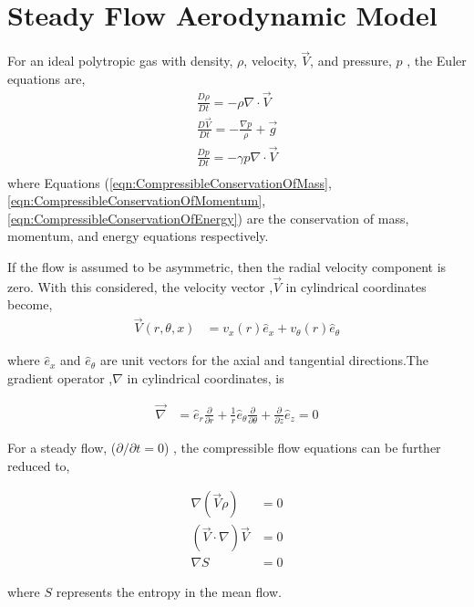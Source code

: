 \section{Steady Flow Aerodynamic Model}
\frame{\sectionpage}
\begin{frame} 
For an ideal polytropic gas with density, $\rho$, velocity, $\vec{V}$, and 
pressure, $p$ , the Euler equations are,
\begin{align}
    \frac{D\rho}{Dt} = - \rho \nabla \cdot \vec{V} 
    \label{eqn:CompressibleConservationOfMass} \\
    \frac{D\vec{V}}{Dt} = - \frac{\nabla p}{\rho} + \vec{g} 
    \label{eqn:CompressibleConservationOfMomentum} \\
    \frac{Dp}{Dt} = - \gamma p \nabla \cdot \vec{V} 
    \label{eqn:CompressibleConservationOfEnergy} \\
\end{align}
where Equations (\ref{eqn:CompressibleConservationOfMass},
\ref{eqn:CompressibleConservationOfMomentum},
\ref{eqn:CompressibleConservationOfEnergy}) are the conservation of mass, 
momentum, and energy equations respectively. 
\end{frame}
\begin{frame}
If the flow is assumed to be asymmetric, then the radial velocity component is 
zero. With this considered, the velocity vector ,$\vec{V}$ in cylindrical coordinates 
become,
\begin{align}
    \vec{V}(r,\theta,x) &= v_x(r) \hat{e}_x + v_{\theta} (r) \hat{e}_{\theta} 
    \label{eqn:VelocityVector}
\end{align}
  
where $\hat{e}_x$ and $\hat{e}_{\theta}$ are unit vectors for the axial and 
tangential directions.The gradient operator ,$\nabla$ in cylindrical
coordinates, is 

\begin{align}
	\vec{\nabla} 
	&= \hat{e}_r \frac{\partial} {\partial r} + 
	\frac{1}{r} \hat{e}_{\theta}   
	\frac{\partial} {\partial \theta} + 
	\frac{\partial }{\partial z} \hat{e}_z = 0
    \label{eqn:NablaInCylindrical}
\end{align}


    
\end{frame}
\begin{frame}
For a steady flow, ($\partial/\partial t = 0$) , the compressible flow equations
can be further reduced to,

\begin{align}
    \nabla (\vec{V} \rho) &=  0 \\
    (\vec{V}\cdot \nabla) \vec{V} &=  0\\
    \nabla S &= 0
\end{align}

where $S$ represents the entropy in the mean flow.


\end{frame}
